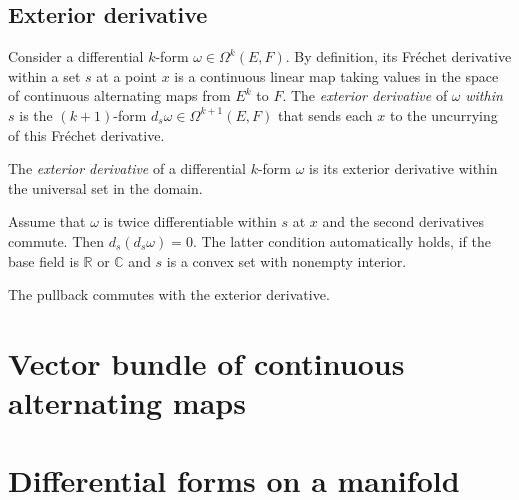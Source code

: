 \section{Exterior derivative}%
\label{sec:exterior-derivative}

\begin{definition}%
  \label{def:ederivWithin}
  Consider a differential \(k\)-form \(\omega \in \Omega^{k}(E, F)\).
  By definition, its Fréchet derivative within a set \(s\) at a point \(x\)
  is a continuous linear map taking values in the space of continuous alternating maps from \(E^{k}\) to \(F\).
  The \emph{exterior derivative} of \(\omega\) \emph{within} \(s\) is the \((k + 1)\)-form \(d_{s}\omega\in\Omega^{k + 1}(E, F)\)
  that sends each \(x\) to the uncurrying of this Fréchet derivative.
\end{definition}

\begin{definition}%
  \label{def:ederiv}
  The \emph{exterior derivative} of a differential \(k\)-form \(\omega\)
  is its exterior derivative within the universal set in the domain.
\end{definition}

\begin{theorem}
  Assume that \(\omega\) is twice differentiable within \(s\) at \(x\)
  and the second derivatives commute. Then \(d_{s}(d_{s}\omega) = 0\).
  The latter condition automatically holds, if the base field is
  \(\mathbb R\) or \(\mathbb C\) and \(s\) is a convex set with
  nonempty interior.
\end{theorem}

\begin{theorem}
  The pullback commutes with the exterior derivative.
\end{theorem}

\chapter{Vector bundle of continuous alternating maps}%
\label{cha:vect-bundle-cont}

\chapter{Differential forms on a manifold}%
\label{cha:diff-forms-manif}

